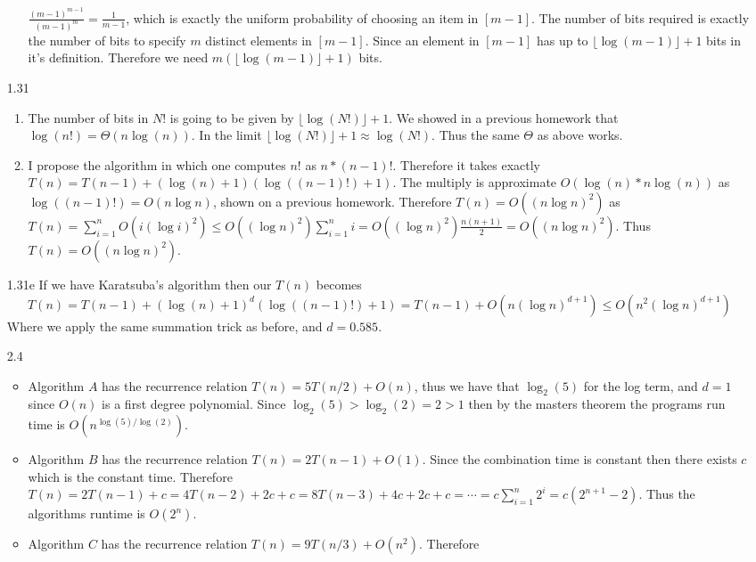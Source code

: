 \documentclass[12pt, letterpaper]{article}
\begin{document}
\begin{enumerate}
\begin{enumerate}
		$\frac{(m-1)^{m-1}}{(m-1)^m} = \frac{1}{m-1}$, which is exactly
		the uniform probability of choosing an item in $[m-1]$.  
		The number of bits required is exactly the number of bits to 
		specify $m$ distinct elements in $[m-1]$.  Since an element in 
		$[m-1]$ has up to $\lfloor \log (m-1) \rfloor + 1$ bits in 
		it's definition.  Therefore we need 
		$m(\lfloor \log (m-1) \rfloor + 1)$ bits.  
	\end{enumerate}
	\item[1.31]   
	\begin{enumerate}
		\item The number of bits in $N!$ is going to be given by $\lfloor \log(N!) \rfloor + 1$.  
		We showed in a previous homework that $\log(n!) = \Theta(n \log (n))$.  In the limit 
		$\lfloor \log(N!) \rfloor + 1 \approx \log(N!)$.  Thus the same $\Theta$ as above works.
		\item I propose the algorithm in which one computes 
		$n!$ as $n*(n-1)!$.  Therefore it takes exactly
		$T(n) = T(n-1) + (\log(n) + 1)(\log ((n-1)!) + 1)$.  
		The multiply is approximate $O(\log(n) * n \log(n))$ as 
		$\log((n-1)!) = O(n \log n)$, shown on a previous homework.
		Therefore $T(n) = O((n\log n)^2)$ as 
		$T(n) = \sum_{i=1}^n O(i (\log i)^2) \leq O((\log n)^2)\sum_{i=1}^n i = O((\log n)^2)\frac{n(n+1)}{2} = O((n \log n)^2)$.
		Thus $T(n) = O((n \log n)^2)$.   
	\end{enumerate}
	\item[1.31e] If we have Karatsuba's algorithm then our $T(n)$ 
	becomes 
	$$T(n) = T(n-1) + (\log(n) + 1)^d (\log((n-1)!) + 1)
	= T(n-1) + O(n (\log n)^{d+1}) \leq O(n^2 (\log n)^{d+1})$$
	Where we apply the same summation trick as before, and 
	$d = 0.585$.  
	\item[2.4]
	\begin{itemize}
		\item Algorithm $A$ has the recurrence relation $T(n) = 5T(n/2) + O(n)$, thus we have that $\log_2(5)$ for the log term, and $d=1$ since $O(n)$
		is a first degree polynomial.  Since $\log_2(5) > \log_2(2) = 2 > 1$ then by the masters
		theorem the programs run time is $O(n^{\log(5)/\log(2)})$.
		\item Algorithm $B$ has the recurrence relation $T(n) = 2T(n-1) + O(1)$.  Since the
		combination time is constant then there exists $c$ which is the constant time.  
		Therefore $T(n) = 2T(n-1) + c = 4T(n-2)+ 2c + c = 8T(n-3) + 4c + 2c + c = \cdots = 
		c\sum_{i=1}^n 2^i  = c(2^{n+1} - 2)$.  Thus the algorithms runtime is $O(2^n)$.  
		\item Algorithm $C$ has the recurrence relation $T(n) = 9T(n/3) + O(n^2)$.  Therefore

\end{itemize}
\end{enumerate}
\end{document}
